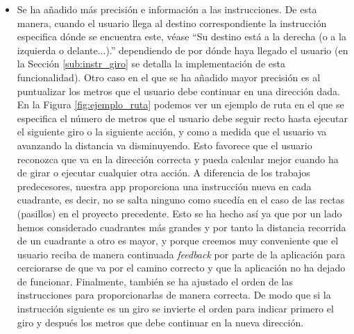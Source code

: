 \begin{itemize}
	\item Se ha añadido más precisión e información a las instrucciones. De esta manera, cuando el usuario llega al destino correspondiente la instrucción especifica dónde se encuentra este, véase ``Su destino está a la derecha (o a la izquierda o delante...).'' dependiendo de por dónde haya llegado el usuario (en la Sección \ref{sub:instr_giro} se detalla la implementación de esta funcionalidad). Otro caso en el que se ha añadido mayor precisión es al puntualizar los metros que el usuario debe continuar en una dirección dada. En la Figura \ref{fig:ejemplo_ruta} podemos ver un ejemplo de ruta en el que se especifica el número de metros que el usuario debe seguir recto hasta ejecutar el siguiente giro o la siguiente acción, y como a medida que el usuario va avanzando la distancia va disminuyendo. Esto favorece que el usuario reconozca que va en la dirección correcta y pueda calcular mejor cuando ha de girar o ejecutar cualquier otra acción. A diferencia de los trabajos predecesores, nuestra app proporciona una instrucción nueva en cada cuadrante, es decir, no se salta ninguno como sucedía en el caso de las rectas (pasillos) en el proyecto precedente. Esto se ha hecho así ya que por un lado hemos considerado cuadrantes más grandes y por tanto la distancia recorrida de un cuadrante a otro es mayor, y porque creemos muy conveniente que el usuario reciba de manera continuada \textit{feedback} por parte de la aplicación para cerciorarse de que va por el camino correcto y que la aplicación no ha dejado de funcionar. Finalmente, también se ha ajustado el orden de las instrucciones para proporcionarlas de manera correcta. De modo que si la instrucción siguiente es un giro se invierte el orden para indicar primero el giro y después los metros que debe continuar en la nueva dirección.
	

\end{itemize}
